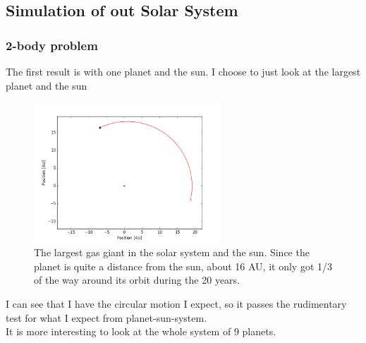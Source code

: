 \documentclass[a4paper, 10pt]{article}
\begin{document}
\subsection{Simulation of out Solar System}
\subsubsection{2-body problem}

The first result is with one planet and the sun. I choose to just look at the largest planet and the sun


\begin{figure}[H]
\begin{center}
\includegraphics[width = 70mm]{part2onePlanet.png}
\caption{The largest gas giant in the solar system and the sun. Since the planet is quite a distance from the sun, about 16 AU, it only got 1/3 of the way around its orbit during the 20 years.}
\end{center}
\end{figure}

I can see that I have the circular motion I expect, so it passes the rudimentary test for what I expect from planet-sun-system. \\ 

It is more interesting to look at the whole system of 9 planets.
\end{document}
